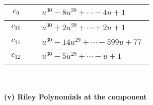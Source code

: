 \documentclass[1p]{elsarticle_modified}
\theoremstyle{definition}
\begin{document}
\begin{tabular}{m{50pt}|m{274pt}}
\hline $$\begin{aligned}c_{9}\end{aligned}$$&$\begin{aligned}
&u^{30}-8 u^{28}+\cdots-4 u+1
\end{aligned}$\\
\hline $$\begin{aligned}c_{10}\end{aligned}$$&$\begin{aligned}
&u^{30}+2 u^{29}+\cdots+2 u+1
\end{aligned}$\\
\hline $$\begin{aligned}c_{11}\end{aligned}$$&$\begin{aligned}
&u^{30}-14 u^{29}+\cdots-599 u+77
\end{aligned}$\\
\hline $$\begin{aligned}c_{12}\end{aligned}$$&$\begin{aligned}
&u^{30}-5 u^{29}+\cdots- u+1
\end{aligned}$\\
\hline
\end{tabular}\\~\\
\newpage\renewcommand{\arraystretch}{1}
\flushleft \textbf{(v) Riley Polynomials at the component}\newline \\
\end{document}
